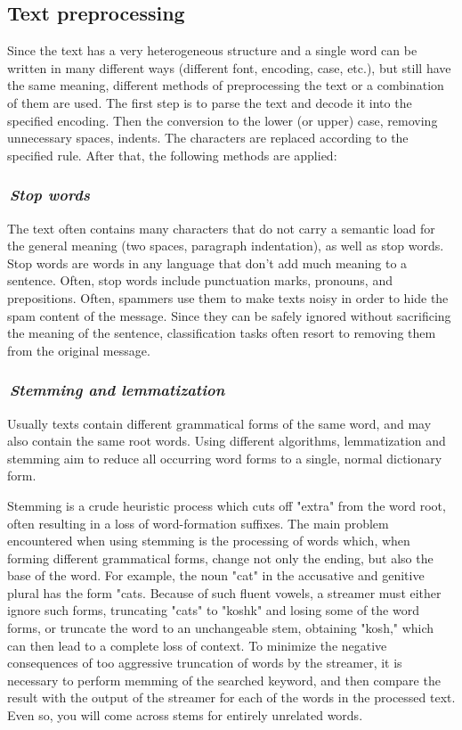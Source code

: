 \documentclass[12pt]{jpconf}
\begin{document}
\subsection{Text preprocessing}
Since the text has a very heterogeneous structure and a single word can be written in many different ways (different font, encoding, case, etc.), but still have the same meaning, different methods of preprocessing the text or a combination of them are used.
The first step is to parse the text and decode it into the specified encoding. Then the conversion to the lower (or upper) case, removing unnecessary spaces, indents. The characters are replaced according to the specified rule. After that, the following methods are applied:

\subsubsection*{\it\,Stop words}
The text often contains many characters that do not carry a semantic load for the general meaning (two spaces, paragraph indentation), as well as stop words.
Stop words are words in any language that don't add much meaning to a sentence. Often, stop words include punctuation marks, pronouns, and prepositions. Often, spammers use them to make texts noisy in order to hide the spam content of the message. Since they can be safely ignored without sacrificing the meaning of the sentence, classification tasks often resort to removing them from the original message.

\subsubsection{\it\,Stemming and lemmatization}
Usually texts contain different grammatical forms of the same word, and may also contain the same root words. Using different algorithms, lemmatization and stemming aim to reduce all occurring word forms to a single, normal dictionary form.


Stemming is a crude heuristic process which cuts off "extra" from the word root, often resulting in a loss of word-formation suffixes. The main problem encountered when using stemming is the processing of words which, when forming different grammatical forms, change not only the ending, but also the base of the word. For example, the noun "cat" in the accusative and genitive plural has the form "cats. Because of such fluent vowels, a streamer must either ignore such forms, truncating "cats" to "koshk" and losing some of the word forms, or truncate the word to an unchangeable stem, obtaining "kosh," which can then lead to a complete loss of context. To minimize the negative consequences of too aggressive truncation of words by the streamer, it is necessary to perform memming of the searched keyword, and then compare the result with the output of the streamer for each of the words in the processed text. Even so, you will come across stems for entirely unrelated words.
\end{document}
